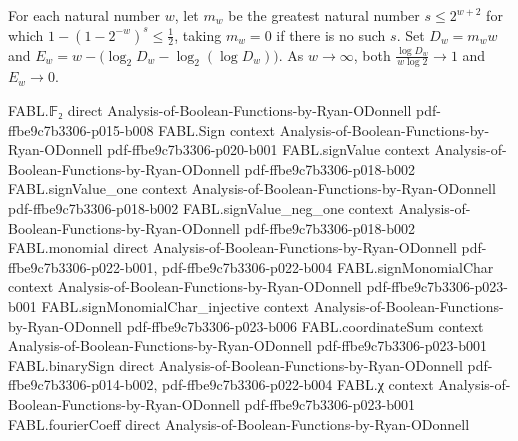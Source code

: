 \begin{theorem}
\label{FABL.tribesCriticalLogLimits}
\leanok
{}
For each natural number $w$, let $m_w$ be the greatest natural number $s\le 2^{w+2}$ for
which $1-(1-2^{-w})^s\le \tfrac12$, taking $m_w=0$ if there is no such $s$. Set $D_w=m_w
w$ and $E_w=w-\bigl(\log_2 D_w-\log_2(\log D_w)\bigr)$. As $w\to\infty$, both
$\frac{\log D_w}{w\log 2}\to 1$ and $E_w\to 0$.
\end{theorem}

\begin{theorem}
\label{FABL.tendsto_log_tribesCriticalDimension_div_width}
\leanok
{}
\proofstep
  {FABL.𝔽₂}
  {direct}
  {Analysis-of-Boolean-Functions-by-Ryan-ODonnell}
  {pdf-ffbe9c7b3306-p015-b008}
\proofstep
  {FABL.Sign}
  {context}
  {Analysis-of-Boolean-Functions-by-Ryan-ODonnell}
  {pdf-ffbe9c7b3306-p020-b001}
\proofstep
  {FABL.signValue}
  {context}
  {Analysis-of-Boolean-Functions-by-Ryan-ODonnell}
  {pdf-ffbe9c7b3306-p018-b002}
\proofstep
  {FABL.signValue_one}
  {context}
  {Analysis-of-Boolean-Functions-by-Ryan-ODonnell}
  {pdf-ffbe9c7b3306-p018-b002}
\proofstep
  {FABL.signValue_neg_one}
  {context}
  {Analysis-of-Boolean-Functions-by-Ryan-ODonnell}
  {pdf-ffbe9c7b3306-p018-b002}
\proofstep
  {FABL.monomial}
  {direct}
  {Analysis-of-Boolean-Functions-by-Ryan-ODonnell}
  {pdf-ffbe9c7b3306-p022-b001,
    pdf-ffbe9c7b3306-p022-b004}
\proofstep
  {FABL.signMonomialChar}
  {context}
  {Analysis-of-Boolean-Functions-by-Ryan-ODonnell}
  {pdf-ffbe9c7b3306-p023-b001}
\proofstep
  {FABL.signMonomialChar_injective}
  {context}
  {Analysis-of-Boolean-Functions-by-Ryan-ODonnell}
  {pdf-ffbe9c7b3306-p023-b006}
\proofstep
  {FABL.coordinateSum}
  {context}
  {Analysis-of-Boolean-Functions-by-Ryan-ODonnell}
  {pdf-ffbe9c7b3306-p023-b001}
\proofstep
  {FABL.binarySign}
  {direct}
  {Analysis-of-Boolean-Functions-by-Ryan-ODonnell}
  {pdf-ffbe9c7b3306-p014-b002,
    pdf-ffbe9c7b3306-p022-b004}
\proofstep
  {FABL.χ}
  {context}
  {Analysis-of-Boolean-Functions-by-Ryan-ODonnell}
  {pdf-ffbe9c7b3306-p023-b001}
\proofstep
  {FABL.fourierCoeff}
  {direct}
  {Analysis-of-Boolean-Functions-by-Ryan-ODonnell}

\end{theorem}
